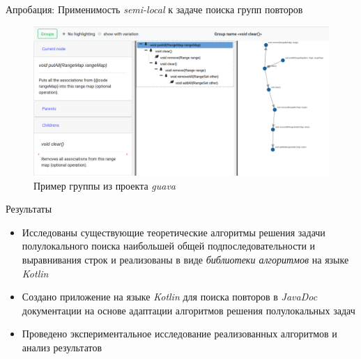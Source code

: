 \documentclass[xcolor=table]{beamer}
\begin{document}
\begin{frame}{Апробация: Применимость \emph{semi-local} к задаче поиска групп повторов}

\begin{figure}
    \centering
 \includegraphics[width=1.0\textwidth]{pictures/outputGroup.png}
 \caption{Пример группы из проекта \emph{guava}}
 \end{figure}
\end{frame}


\begin{frame}{Результаты}
    \begin{itemize}
    \vfill\item Исследованы существующие теоретические алгоритмы решения задачи полулокального поиска наибольшей общей подпоследовательности и  выравнивания строк и реализованы в виде     \emph{библиотеки алгоритмов} на языке \emph{Kotlin}
    \vfill\item Создано приложение на языке \emph{Kotlin} для поиска повторов в \emph{JavaDoc} документации на основе адаптации алгоритмов решения полулокальных задач
    \vfill\item Проведено экспериментальное исследование реализованных алгоритмов  и  анализ результатов
    \end{itemize}
       
\end{frame}
\end{document}
